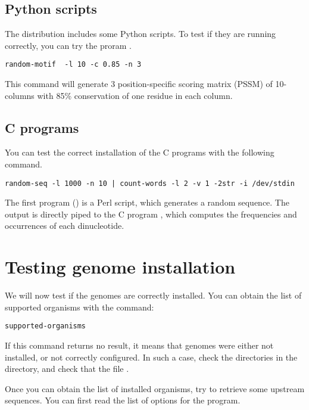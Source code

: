 \subsection{Python scripts}

The \RSAT distribution includes some Python scripts. To test if they
are running correctly, you can try the proram .

\begin{lstlisting}
random-motif  -l 10 -c 0.85 -n 3
\end{lstlisting}

This command will generate 3 position-specific scoring matrix (PSSM)
of 10-columns with 85\% conservation of one residue in each column.

\subsection{C programs}

You can test the correct installation of the C programs with the
following command.

\begin{lstlisting}random-seq -l 1000 -n 10 | count-words -l 2 -v 1 -2str -i /dev/stdin
\end{lstlisting}

The first program () is a Perl script, which
generates a random sequence. The output is directly piped to the C
program , which computes the frequencies and
occurrences of each dinucleotide.

\section{Testing genome installation}

We will now test if the genomes are correctly installed. You can
obtain the list of supported organisms with the command:

\begin{lstlisting}
supported-organisms
\end{lstlisting}


If this command returns no result, it means that genomes were either
not installed, or not correctly configured. In such a case, check the
directories in the  directory, and check that the
file .

Once you can obtain the list of installed organisms, try to retrieve
some upstream sequences. You can first read the list of options for the
 program.

